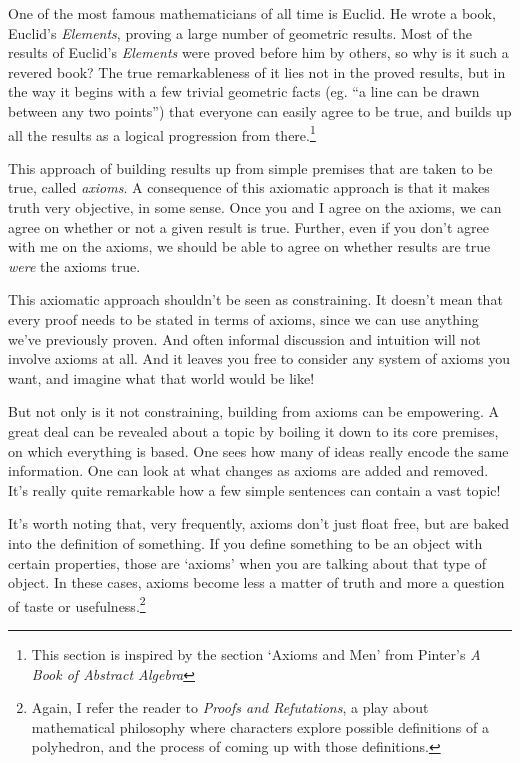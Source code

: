 \documentclass{report}
\begin{document}
One of the most famous mathematicians of all time is Euclid. He wrote a book, Euclid's \emph{Elements}, proving a large number of geometric results. Most of the results of Euclid's \emph{Elements} were proved before him by others, so why is it such a revered book? The true remarkableness of it lies not in the proved results, but in the way it begins with a few trivial geometric facts (eg. ``a line can be drawn between any two points'') that everyone can easily agree to be true, and builds up all the results as a logical progression from there.\footnote{This section is inspired by the section `Axioms and Men' from Pinter's \emph{A Book of Abstract Algebra}}

This approach of building results up from simple premises that are taken to be true, called \emph{axioms}. A consequence of this axiomatic approach is that it makes truth very objective, in some sense. Once you and I agree on the axioms, we can agree on whether or not a given result is true.
Further, even if you don't agree with me on the axioms, we should be able to agree on whether results are true \emph{were} the axioms true.

This axiomatic approach shouldn't be seen as constraining. It doesn't mean that every proof needs to be stated in terms of axioms, since we can use anything we've previously proven. And often informal discussion and intuition will not involve axioms at all. And it leaves you free to consider any system of axioms you want, and imagine what that world would be like!

But not only is it not constraining, building from axioms can be empowering. A great deal can be revealed about a topic by boiling it down to its core premises, on which everything is based. One sees how many of ideas really encode the same information. One can look at what changes as axioms are added and removed. It's really quite remarkable how a few simple sentences can contain a vast topic!

It's worth noting that, very frequently, axioms don't just float free, but are baked into the definition of something. If you define something to be an object with certain properties, those are `axioms' when you are talking about that type of object. In these cases, axioms become less a matter of truth and more a question of taste or usefulness.\footnote{Again, I refer the reader to \emph{Proofs and Refutations}, a play about mathematical philosophy where characters explore possible definitions of a polyhedron, and the process of coming up with those definitions.}
\end{document}

